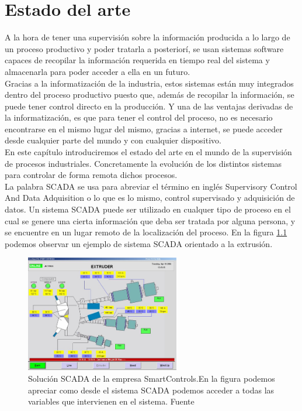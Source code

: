 
\chapter{Estado del arte}
\label{cap:estado}
A la hora de tener una supervisión sobre la información producida a lo largo de un proceso productivo y poder tratarla a posteriorí, se usan sistemas software capaces de recopilar la información requerida en tiempo real del sistema y almacenarla para poder acceder a ella en un futuro.\\

Gracias a la informatización de la industria, estos sistemas están muy integrados dentro del proceso productivo puesto que, además de recopilar la información, se puede tener control directo en la producción. Y una de las ventajas derivadas de la informatización, es que para tener el control del proceso, no es necesario encontrarse en el mismo lugar del mismo, gracias a internet, se puede acceder desde cualquier parte del mundo y con cualquier dispositivo.\\

En este capítulo introduciremos el estado del arte en el mundo de la supervisión de procesos industriales. Concretamente la evolución de los distintos sistemas para controlar de forma remota dichos procesos.\\

La palabra SCADA se usa para abreviar el término en inglés Supervisory Control And Data Adquisition o lo que es lo mismo, control supervisado y adquisición de datos. Un sistema SCADA puede ser utilizado en cualquer tipo de proceso en el cual se genere una cierta información que deba ser tratada por alguna persona, y se encuentre en un lugar remoto de la localización del proceso. En la figura \ref{fig:smart_Controls} podemos observar un ejemplo de sistema SCADA orientado a la extrusión.\\

\begin{figure}[H]
    \centering
    \includegraphics[width=0.6\textwidth]{images/triplex-extruder.jpg}
    \caption[Solución SCADA de la empresa SmartControls.]{Solución SCADA de la empresa SmartControls.En la figura podemos apreciar como desde el sistema SCADA podemos acceder a todas las variables que intervienen en el sistema. Fuente \cite{smartcontrols}}
    \label{fig:smart_Controls}
\end{figure}

